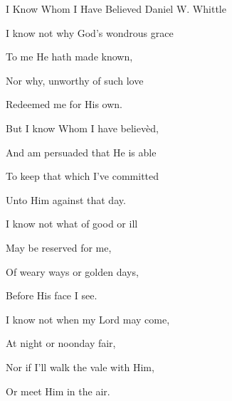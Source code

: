 \documentclass[12pt]{book}
\begin{document}
\begin{song}{I Know Whom I Have Believed}{}
  {\SBPubDom}
  {Daniel W. Whittle}
  {}
  {}

  \begin{SBVerse}
    I know not why God's wondrous grace

    To me He hath made known,

    Nor why, unworthy of such love

    Redeemed me for His own.
  \end{SBVerse}

  \begin{SBOpGroup}
    But I know Whom I have believ\`ed,

    And am persuaded that He is able

    To keep that which I've committed

    Unto Him against that day.
  \end{SBOpGroup}

  \begin{SBVerse}
    I know not what of good or ill

    May be reserved for me,

    Of weary ways or golden days,

    Before His face I see.
  \end{SBVerse}

  \begin{SBVerse}
    I know not when my Lord may come,

    At night or noonday fair,

    Nor if I'll walk the vale with Him,

    Or meet Him in the air.
  \end{SBVerse}
\end{song}
\end{document}
